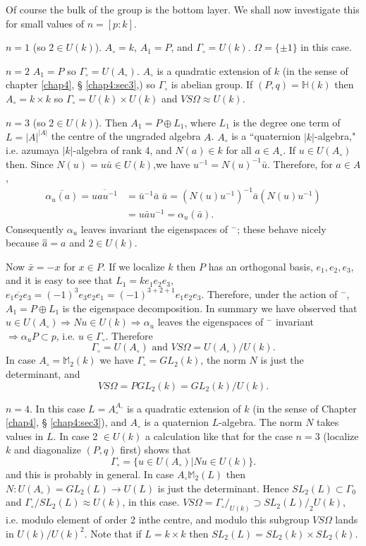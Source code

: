 Of course the bulk of the group is the bottom layer. We shall now
investigate this for small values of $n = [p: k]$.  

\textit{$n = 1$} (so $2 \in U (k)$). $A_\circ = k$, $A_1 = P$, and
$\Gamma_\circ = U(k)$. $\Omega = \{\pm 1\}$ in this case. 
 
 \textit{$n = 2$} $A_1= P$ so $\Gamma_\circ = U(A_\circ)$. $A_\circ$ is a
 quadratic extension of $k$ (in the sense of chapter \ref{chap4}, \S
 \ref{chap4:sec3},) so 
 $\Gamma_\circ$ is abelian group. If $(P,q) = \mathbb{H}(k)$ then $A_\circ =
 k \times k$ so $\Gamma_\circ = U (k) \times U(k)$ and $V S
 \Omega\approx U (k)$.  
 
\textit{$n = 3$} (so $2 \in U(k)$). Then $A_1 = P \oplus L_1$, where
$L_1$ is the degree one term of $L = |A|^{|A|}$ the centre of the
ungraded algebra $A$. $A_\circ$ is a ``quaternion $|k|$-algebra,"
i.e. azumaya $| k |$-algebra of rank 4, and $N(a)\in k$ for all $a \in
A_\circ$. If $u \in U (A_\circ)$ then. Since $N(u) = u\bar{u}
\in U (k)$,\pageoriginale we have $u^{-1} = N
(u)^{-1}\bar{u}$. Therefore, for $a \in A$,    
\begin{align*}
\overline{\alpha_u (a)} = \overline{u a u^{-1}} &= \bar{u}^{-1}
\bar{a} \; \bar{u} = (N(u) u^{-1})^{-1} \bar{a} (N(u)u^{-1})\\ 
&= u \bar{a} u^{-1} = \alpha_u (\bar{a}). 
\end{align*}
Consequently $\alpha_u$ leaves invariant the eigenspaces of ${}^-$; these
behave nicely because $\overset{=}{a} = a$ and $2 \in U(k)$. 

Now $\bar{x} = - x$ for $x \in P$. If we localize $k$ then $P$ has an
orthogonal basis, $e_1, e_2, e_3$, and it is easy to see that $L_1 =
ke_1 e_2 e_3$, $\overline{e_1 e_2 e_3} = (-1)^3 e_3 e_2 e_1 =
(-1)^{3+2+1} e_1 e_2 e_3$. Therefore, under the action of $^-$, $A_1 =
P \oplus L_1$ is the eigenspace decomposition. In summary we have
observed that $u \in U(A_\circ) \Rightarrow Nu \in U(k) \Rightarrow
\alpha_u$ leaves the eigenspaces of $^-$ invariant $\Rightarrow
\alpha_u P \subset p$, i.e. $u \in \Gamma_\circ$. Therefore  
$$
\Gamma_\circ = U (A_\circ) \text{ and } V S \Omega = U (A_\circ) / U (k).
$$
In case $A_\circ = \mathbb{M}_2 (k)$ we have $\Gamma_\circ = GL_2
(k)$, the norm $N$ is just the determinant, and   
$$
VS \Omega = PGL_2 (k) = GL_2 (k) / U (k). 
$$

\textit{$n = 4$}. In this case $L = A_\circ^{A_\circ}$ is a quadratic
extension of $k$ (in the sense of Chapter \ref{chap4}, \S
\ref{chap4:sec3}), and $A_\circ$ is a quaternion 
$L$-algebra. The norm $N$ takes values in $L$. In case 2 $\in U(k)$ a
calculation like that for the case $n = 3$ (localize $k$ and
diagonalize $(P, q)$ first) shows that 
$$
\Gamma_\circ = \{u \in U (A_\circ) \big| Nu \in U(k)\}. 
$$
and this is probably in general. In case $A_\circ \mathbb{M}_2 (L)$ then
$N: U(A_\circ) = GL_2 (L) \to U(L)$ is just the determinant. Hence $SL_2
(L) \subset \Gamma_0$ and $\Gamma_\circ/ SL_2 (L)\approx U(k)$, in this
case. $VS \Omega = \Gamma_\circ/_{U(k)} \supset SL_2 (L)/_2 U(k)$,
i.e. modulo element of order 2 in\pageoriginale the centre, and modulo
this subgroup $ V S \Omega$ lands in $U(k)/U(k)^2$. Note that if $L =
k \times k$ then $ S L_2(L) = SL_2(k)\times SL_2 (k)$.  

